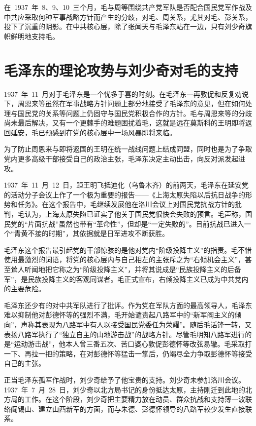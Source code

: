 在~1937~年~8、9、10~三个月，毛与周等围绕共产党军队是否配合国民党军作战及中共应采取何种军事战略方针而产生的分歧，对毛、周关系，尤其对毛、彭关系，投下了沉重的阴影。在中共核心层，除了张闻天与毛泽东站在一边，只有刘少奇旗帜鲜明地支持毛。

\section{毛泽东的理论攻势与刘少奇对毛的支持}

1937~年~11~月对于毛泽东是一个忧多于喜的时刻。在毛泽东一再敦促和反复劝说下，周恩来等虽然在军事战略方针问题上部分地接受了毛泽东的意见，但在如何处理与国民党的关系等问题上仍固守与国民党积极合作的方针。毛与周恩来等的分歧尚未最后解决，又有一个更棘手的难题困扰着毛，这就是远在莫斯科的王明即将返回延安，毛已预感到在党的核心层中一场风暴即将来临。

为了防止周恩来与即将返国的王明在统一战线问题上结成同盟，同时也是为了争取党内更多高级干部接受自己的政治主张，毛泽东决定主动出击，向反对派发起进攻。

1937~年~11~月~12~日，距王明飞抵迪化（乌鲁木齐）的前两天，毛泽东在延安党的活动分子会议上作了一个极为重要的报告——《上海太原失陷以后抗日战争的形势和任务》。在这个报告中，毛继续发展他在洛川会议上对国民党抗战方针的批判，毛认为，上海太原失陷已证实了他关于国民党很快会失败的预言。毛声称，国民党的“片面抗战”虽然也带有“革命性”，但却是“一定失败的”。目前抗战已进入一个“青黄不接的时期”，其依据就是日军进攻不断获胜。

毛泽东这个报告最引起党的干部惊骇的是他对党内“阶级投降主义”的指责。毛不惜使用最激烈的词语，将党的核心层内与自己相左的主张斥之为“右倾机会主义”，甚至耸人听闻地把它称之为“阶级投降主义”，并将其说成是“民族投降主义的后备军”，是民族投降主义的客观同谋者。毛正式宣布，右倾投降主义已成为中共党内的主要危险。

毛泽东还少有的对中共军队进行了批评。作为党在军队方面的最高领导人，毛泽东难以抑制他对彭德怀等的强烈不满，毛开始谴责起八路军中的“新军阀主义的倾向”，声称其表现为八路军中有人以接受国民党委任为荣耀”。随后毛话锋一转，又表扬八路军执行了“独立自主的山地游击战”的战略方针。尽管毛明知八路军进行的是“运动游击战”，他本人曾三番五次、苦口婆心敦促彭德怀等改弦易辙。毛采取打一下、再拉一把的策略，在对彭德怀等猛击一掌后，仍竭尽全力争取彭德怀等接受自己的主张。

正当毛泽东孤军作战时，刘少奇给予了他宝贵的支持。刘少奇未参加洛川会议。1937~年~7~月~28~日，刘少奇以北方局书记的身份抵达太原，主持刚迁到此地的北方局的工作。在这个阶段，刘少奇把主要精力放在动员、群众抗战和支持薄一波联络阎锡山、建立山西新军的方面，而与朱德、彭德怀领导的八路军较少发生直接联系。

